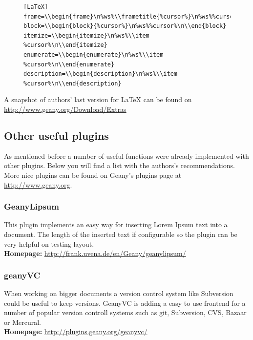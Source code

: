 \documentclass[%
a4paper,%
10pt,%
oneside,%
DIV18,
headsepline,
plainheadsepline,
footsepline,
plainfootsepline,
bibtotoc,%
liststotoc,%
BCOR12mm,%
halfparskip,%
openany,%
]{scrartcl}
\begin{document}
\begin{figure}[h!]
\begin{lstlisting}
[LaTeX]
frame=\\begin{frame}\n%ws%\\frametitle{%cursor%}\n%ws%%cursor%\n\\end{frame}
block=\\begin{block}{%cursor%}\n%ws%%cursor%\n\\end{block}
itemize=\\begin{itemize}\n%ws%\\item %cursor%\n\\end{itemize}
enumerate=\\begin{enumerate}\n%ws%\\item %cursor%\n\\end{enumerate}
description=\\begin{description}\n%ws%\\item %cursor%\n\\end{description}
\end{lstlisting}
\end{figure}

A snapshot of authors' last version for LaTeX can be found on
\url{http://www.geany.org/Download/Extras}

\subsection{Other useful plugins}
As mentioned before a number of useful functions were already
implemented with other plugins. Below you will find a list with the
authors's recommendations. More nice plugins can be found on Geany's
plugins page at \url{http://www.geany.org}.

\subsubsection{GeanyLipsum}
This plugin implements an easy way for inserting Lorem Ipsum text into
a document. The length of the inserted text if configurable so the
plugin can be very helpful on testing layout.\\
\textbf{Homepage:} \url{http://frank.uvena.de/en/Geany/geanylipsum/}

\subsubsection{geanyVC}
When working on bigger documents a version control system like
Subversion could be useful to keep versions. GeanyVC is adding a easy
to use frontend for a number of popular version controll systems such
as git, Subversion, CVS, Bazaar or Mercural.\\
\textbf{Homepage:} \url{http://plugins.geany.org/geanyvc/}
\end{document}

